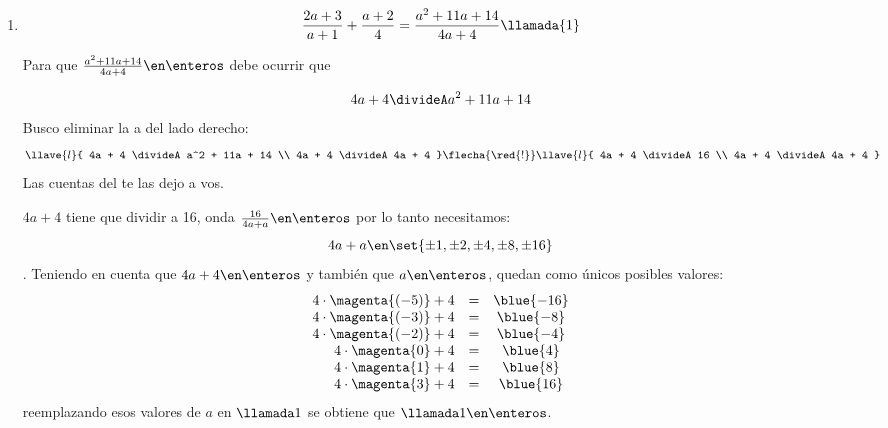 \begin{enumerate}[label=\enumeracion*)]
  \item
        $$
          \frac{2a + 3}{a+1} + \frac{a+2}{4} = \frac{a^2 + 11a + 14}{4a+4} \llamada{1}
        $$

        Para que $\frac{a^2 + 11a + 14}{4a+4} \en \enteros$ debe ocurrir que

        $$
          4a + 4 \divideA a^2 + 11a + 14
        $$
        Busco eliminar la a del lado derecho:
        $$
          \llave{l}{
            4a + 4 \divideA a^2 + 11a + 14 \\
            4a + 4 \divideA 4a + 4
          }
          \flecha{\red{!}}
          \llave{l}{
            4a + 4 \divideA 16 \\
            4a + 4 \divideA 4a + 4
          }
        $$
        Las cuentas del \red{!} te las dejo a vos.

        $4a+4$ tiene que dividir a 16, onda $\frac{16}{4a + a} \en \enteros$ por lo tanto necesitamos:
        $$
          4a + a \en \set{\pm1,\pm2,\pm4,\pm8,\pm16}
        $$.
        Teniendo en cuenta que $4a + 4 \en \enteros$ y también que $a \en \enteros$, quedan como únicos posibles valores:
        $$
          \begin{array}{rcc}
            4 \cdot \magenta{(-5)} + 4 & = & \blue{-16} \\
            4 \cdot \magenta{(-3)} + 4 & = & \blue{-8}  \\
            4 \cdot \magenta{(-2)} + 4 & = & \blue{-4}  \\
            4 \cdot \magenta{0} + 4    & = & \blue{4}   \\
            4 \cdot \magenta{1} + 4    & = & \blue{8}   \\
            4 \cdot \magenta{3} + 4    & = & \blue{16}
          \end{array}
        $$
        reemplazando esos valores de $a$ en $\llamada1$ se obtiene que  $ \llamada1 \en \enteros$.
\end{enumerate}

\begin{aportes}
  \item {}
  \item {}
\end{aportes}
